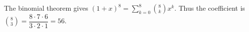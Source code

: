 The binomial theorem gives $(1+x)^8=\sum_{k=0}^8\binom8k x^k$. Thus the coefficient is $\binom83=\dfrac{8\cdot7\cdot6}{3\cdot2\cdot1}=\boxed{56}$.
